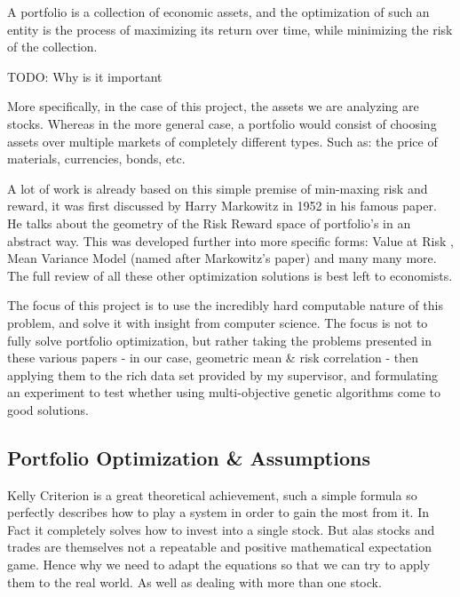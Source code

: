 \documentclass[11pt]{article}
\begin{document}
    A portfolio is a collection of economic assets, and the optimization of such an
    entity is the process of maximizing its return over time, while minimizing the
    risk of the collection.

    TODO: Why is it important

    More specifically, in the case of this project, the assets we are analyzing are
    stocks. Whereas in the more general case, a portfolio would consist of choosing
    assets over multiple markets of completely different types. Such as: the price of 
    materials, currencies, bonds, etc. 

    A lot of work is already based on this simple premise of min-maxing risk and
    reward, it was first discussed by Harry Markowitz in 1952 \cite{Markowitz}
    in his famous paper. He talks about the geometry of the Risk Reward space
    of portfolio's in an abstract way. This was developed further into more specific
    forms: Value at Risk \cite{ValueAtRisk, Ghaoui}, Mean Variance Model (named
    after Markowitz's paper) \cite{Robert, SidWard} and many many more.
    The full review of all these other optimization solutions is best left
    to economists.

    The focus of this project is to use the incredibly hard computable nature
    of this problem, and solve it with insight from computer science. The focus
    is not to fully solve portfolio optimization, but rather taking the problems
    presented in these various papers - in our case, geometric mean \& risk
    correlation - then applying them to the rich data set provided
    by my supervisor, and formulating an experiment to test whether using
    multi-objective genetic algorithms come to good solutions.

\subsection{Portfolio Optimization \& Assumptions}

    Kelly Criterion \cite{Kelly} is a great theoretical achievement, such a simple formula so
    perfectly describes how to play a system in order to gain the most from it. In Fact
    it completely solves how to invest into a single stock. But alas
    stocks and trades are themselves not a repeatable and positive mathematical expectation
    game. Hence why we need to adapt the equations so that we can try to apply them to the
    real world. As well as dealing with more than one stock.
\end{document}
